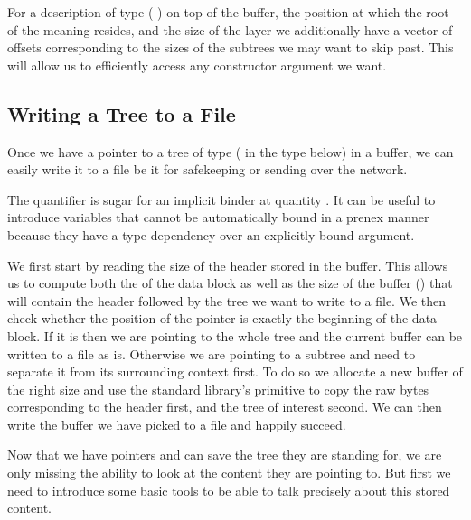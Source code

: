 For a description of type (   )
on top of the buffer, the position at which the root of the meaning resides,
and the size of the layer we additionally have a vector of  offsets
corresponding to the sizes of the subtrees we may want to skip past.
This will allow us to efficiently access any constructor argument we want.

\subsection{Writing a Tree to a File}\label{sec:writetofile}

Once we have a pointer to a tree  of type 
(   in the type below)
in a buffer, we can easily write it to a file be it for safekeeping
or sending over the network.



\begin{remark}
  The  quantifier is sugar for an implicit
  binder at quantity .
  It can be useful to introduce variables that cannot be automatically
  bound in a prenex manner because they have a type dependency over an
  explicitly bound argument.
\end{remark}


We first start by reading the size of the header stored in the buffer.
%
This allows us to compute both the  of the data block
as well as the size of the buffer () that will
contain the header followed by the tree we want to write to a file.
%
We then check whether the position of the pointer is exactly the beginning
of the data block.
%
If it is then we are pointing to the whole tree and the current buffer can
be written to a file as is.
%
Otherwise we are pointing to a subtree and need to separate it from its
surrounding context first.
%
To do so we allocate a new buffer of the right size and use the
standard library's  primitive to copy the raw bytes
corresponding to the header first, and the tree of interest second.
%
We can then write the buffer we have picked to a file and happily succeed.



Now that we have pointers and can save the tree they are standing for,
we are only missing the ability to look at the content they are pointing to.
%
But first we need to introduce some basic tools
to be able to talk precisely about this stored content.
